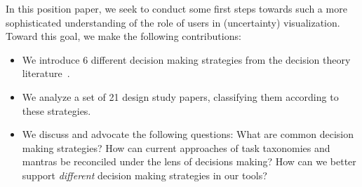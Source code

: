 In this position paper, we seek to conduct some first steps towards such a more
sophisticated understanding of the role of users in (uncertainty)
visualization. Toward this goal, we make the following contributions:
\begin{itemize} 
\item We introduce 6 different decision making strategies from
      the decision theory literature~\citep{Payne:1993}.
\item We analyze a set of 21 design study papers, classifying them according 
      to these strategies.  
\item We discuss and advocate the following questions: What
      are common decision making strategies? How can current approaches of task
      taxonomies and mantras be reconciled under the lens of decisions making?
      How can we better support \emph{different} decision making strategies in
      our tools?  
\end{itemize}
  



